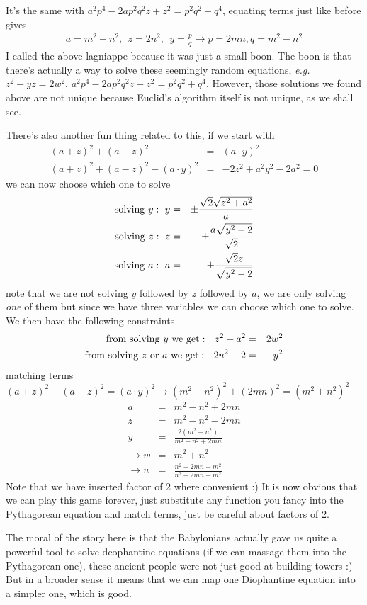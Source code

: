 \documentclass[aps,preprint,preprintnumbers,nofootinbib,showpacs,prd]{revtex4-1}
\newcommand{\eg}{{\it e.g.} }
\newcommand{\nbea}{\begin{eqnarray*}}
\newcommand{\neea}{\end{eqnarray*}}
\begin{document}
It's the same with $a^2 p^4 - 2 a p^2 q^2 z + z^2 = p^2 q^2 + q^4$, equating terms just like before gives
%
\nbea
a = m^2-n^2, ~~ z = 2 n^2,~~ y = \frac{p}{q} \rightarrow p = 2mn, q = m^2 - n^2
\neea
%
I called the above lagniappe because it was just a small boon. The boon is that there's actually a way to solve these seemingly random equations, \eg $z^2 - yz = 2 w^2$, $a^2 p^4 - 2 a p^2 q^2 z + z^2 = p^2 q^2 + q^4$. However, those solutions we found above are not unique because Euclid's algorithm itself is not unique, as we shall see.

There's also another fun thing related to this, if we start with
%
\nbea
(a+z)^2 + (a-z)^2 & = & (a \cdot y)^2 \\
(a+z)^2 + (a-z)^2 - (a \cdot y)^2 & = & -2 z^2 + a^2 y^2 - 2 a^2 = 0
\neea
%
we can now choose which one to solve
%
\nbea
{\rm solving ~} y:~ y & = & \pm \frac{\sqrt{2}\sqrt{z^2 + a^2}}{a} \\
{\rm solving ~} z:~ z & = & \pm \frac{a\sqrt{y^2 - 2}}{\sqrt{2}} \\
{\rm solving ~} a:~ a & = & \pm \frac{\sqrt{2}z}{\sqrt{y^2 - 2}}
\neea
%
note that we are not solving $y$ followed by $z$ followed by $a$, we are only solving {\it one} of them but since we have three variables we can choose which one to solve. We then have the following constraints
%
\nbea
{\rm from~solving~}y{\rm~we~get}:~~z^2 + a^2 & = & 2w^2 \\
{\rm from~solving~}z{\rm~or~}a{\rm~we~get}:~~2 u^2 + 2 & = & y^2
\neea
%
matching terms $(a+z)^2 + (a-z)^2 = (a \cdot y)^2 \rightarrow (m^2-n^2)^2 + (2mn)^2 = (m^2 + n^2)^2$
%
\nbea
a & = & m^2-n^2 + 2mn \\
z & = & m^2-n^2 - 2mn \\
y & = & \frac{2(m^2 + n^2)}{m^2-n^2 + 2mn} \\
\rightarrow w & = & m^2 + n^2 \\
\rightarrow u & = & \frac{n^2 + 2mn - m^2}{n^2 - 2mn - m^2}
\neea
%
Note that we have inserted factor of 2 where convenient :) It is now obvious that we can play this game forever, just substitute any function you fancy into the Pythagorean equation and match terms, just be careful about factors of 2.

The moral of the story here is that the Babylonians actually gave us quite a powerful tool to solve deophantine equations (if we can massage them into the Pythagorean one), these ancient people were not just good at building towers :) But in a broader sense it means that we can map one Diophantine equation into a simpler one, which is good.
\end{document}
